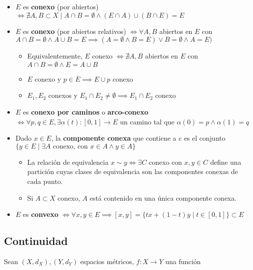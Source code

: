 \documentclass[a4paper,twocolumn]{extarticle}
\begin{document}
\begin{itemize}
	\item $E$ es \textbf{conexo} (por abiertos) $\iff \nexists A, B \subset X \mid A \cap B = \emptyset \land (E \cap A) \cup (B \cap E) = E$
	\item $E$ es \textbf{conexo} (por abiertos relativos) $\iff \forall A,B$ abiertos en $E$ con $A \cap B = \emptyset \land A \cup B = E \implies (A = \emptyset \land B = E) \lor B = \emptyset \land A = E)$
	\begin{itemize}
		\item Equivalentemente, $E$ conexo $\iff \nexists A,B$ abiertos en $E$ con $A\cap B = \emptyset \land E = A \cup B$
		\item $E$ conexo y $p \in \overline{E} \implies E \cup p$ conexo
		\item $E_1, E_2$ conexos y $E_1 \cap E_2 \neq \emptyset \implies E_1 \cap E_2$ conexo
	\end{itemize}
	\item $E$ es \textbf{conexo por caminos} o \textbf{arco-conexo} $\iff \forall p,q \in E, \exists \alpha(t):[0,1] \to E$ un camino tal que $\alpha(0) = p \land \alpha(1) = q$
	\item Dado $x \in E$, la \textbf{componente conexa} que contiene a $e$ es el conjunto $\{y \in E \mid \exists A \text{ conexo, con } x \in A \land y \in A\}$
	\begin{itemize}
		\item La relación de equivalencia $x\sim y \iff \exists C$ conexo con $x,y \in C$ define una partición cuyas clases de equivalencia son las componentes conexas de cada punto.
		\item Si $A \subset X$ conexo, $A$ está contenido en una única componente conexa.
	\end{itemize}
	\item $E$ es \textbf{convexo} $\iff \forall x, y \in E \implies [x,y] = \{tx + (1-t)y \mid t \in [0,1]\} \subset E$
\end{itemize}

\subsection{Continuidad}

Sean $(X, d_X), (Y, d_Y)$ espacios métricos, $f:X \to Y$ una función
\end{document}
